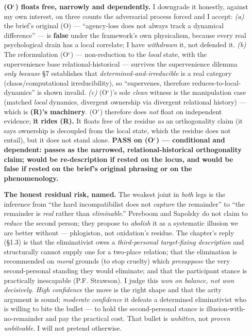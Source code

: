 \documentclass[11pt]{article}
\begin{document}
\textbf{(O\ensuremath{`}) floats free, narrowly and dependently.} I downgrade it honestly, against my own interest, on three counts the adversarial process forced and I accept: \emph{(a)} the brief's original (O) — ``agency-loss does not always track a dynamical difference'' — is \textbf{false} under the framework's own physicalism, because every real psychological drain has a local correlate; I have \emph{withdrawn} it, not defended it. \emph{(b)} The reformulation (O\ensuremath{`}) — non-reduction to the \emph{local} state, with the supervenience base relational-historical — survives the supervenience dilemma \emph{only because} §7 establishes that \emph{determined-and-irreducible} is a real category (chaos/\allowbreak{}computational irreducibility), so ``supervenes, therefore reduces-to-local-dynamics'' is shown invalid. \emph{(c)} (O\ensuremath{`})'s sole \emph{clean} witness is the manipulation case (matched \emph{local} dynamics, divergent ownership via divergent relational history) — which is \textbf{(R)'s machinery}. (O\ensuremath{`}) therefore does \emph{not} float on independent evidence; \textbf{it rides (R).} It floats free of the residue \emph{as} an orthogonality claim (it says ownership is decoupled from the local state, which the residue does not entail), but it does not stand alone. \textbf{PASS on (O\ensuremath{`}) — conditional and dependent: passes as the narrowed, relational-historical orthogonality claim; would be re-description if rested on the locus, and would be false if rested on the brief's original phrasing or on the phenomenology.}

\textbf{The honest residual risk, named.} The weakest joint in \emph{both} legs is the inference from ``the hard incompatibilist does not \emph{capture} the remainder'' to ``the remainder is \emph{real} rather than \emph{eliminable}.'' Pereboom and Sapolsky do not claim to \emph{reduce} the second person; they propose to \emph{abolish} it as a systematic illusion we are better without — phlogiston, not oxidation's residue. The chapter's reply (§1.3) is that the eliminativist owes a \emph{third-personal target-fixing description} and structurally cannot supply one for a two-place relation; that the elimination is recommended on \emph{moral} grounds (to stop cruelty) which \emph{presuppose} the very second-personal standing they would eliminate; and that the participant stance is practically inescapable (P.F. Strawson). I judge this \emph{won on balance, not won decisively.} \emph{High confidence} the move is the right shape and that the arity argument is sound; \emph{moderate confidence} it defeats a determined eliminativist who is willing to bite the bullet — to hold the second-personal stance is illusion-with-no-remainder and pay the practical cost. That bullet is \emph{unbitten}, not \emph{proven unbiteable}. I will not pretend otherwise.
\end{document}
